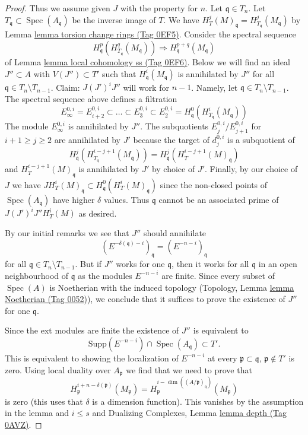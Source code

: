 \documentclass{amsart}
\theoremstyle{plain}
\theoremstyle{definition}
\theoremstyle{remark}
\numberwithin{equation}{subsection}
\def\Spec{\mathop{\mathrm{Spec}}}
\begin{document}
\begin{proof}
\medskip\noindent
Thus we assume given $J$ with the property for $n$.
Let $\mathfrak q \in T_n$. Let $T_\mathfrak q \subset \Spec(A_\mathfrak q)$
be the inverse image of $T$. We have
$H^j_T(M)_\mathfrak q = H^j_{T_\mathfrak q}(M_\mathfrak q)$
by Lemma \href{https://stacks.math.columbia.edu/tag/0EF5}{lemma torsion change rings (Tag 0EF5)}.
Consider the spectral sequence
$$
H_\mathfrak q^p(H^q_{T_\mathfrak q}(M_\mathfrak q))
\Rightarrow
H^{p + q}_\mathfrak q(M_\mathfrak q)
$$
of Lemma \href{https://stacks.math.columbia.edu/tag/0EF6}{lemma local cohomology ss (Tag 0EF6)}.
Below we will find an ideal $J'' \subset A$ with $V(J'') \subset T'$
such that $H^i_\mathfrak q(M_\mathfrak q)$ is annihilated by $J''$ for all
$\mathfrak q \in T_n \setminus T_{n - 1}$.
Claim: $J (J')^i J''$ will work for $n - 1$.
Namely, let $\mathfrak q \in T_n \setminus T_{n - 1}$.
The spectral sequence above defines a filtration
$$
E_\infty^{0, i} = E_{i + 2}^{0, i} \subset \ldots \subset E_3^{0, i} \subset
E_2^{0, i} = H^0_\mathfrak q(H^i_{T_\mathfrak q}(M_\mathfrak q))
$$
The module $E_\infty^{0, i}$ is annihilated by $J''$.
The subquotients $E_j^{0, i}/E_{j + 1}^{0, i}$ for $i + 1 \geq j \geq 2$
are annihilated by $J'$ because the target of $d_j^{0, i}$
is a subquotient of
$$
H^j_\mathfrak q(H^{i - j + 1}_{T_\mathfrak q}(M_\mathfrak q)) =
H^j_\mathfrak q(H^{i - j + 1}_T(M)_\mathfrak q)
$$
and $H^{i - j + 1}_T(M)_\mathfrak q$ is annihilated by $J'$ by choice of $J'$.
Finally, by our choice of $J$ we have
$J H^i_T(M)_\mathfrak q \subset H^0_\mathfrak q(H^i_T(M)_\mathfrak q)$
since the non-closed points of $\Spec(A_\mathfrak q)$ have higher
$\delta$ values. Thus $\mathfrak q$ cannot be an associated prime of
$J(J')^iJ'' H^i_T(M)$ as desired.

\medskip\noindent
By our initial remarks we see that $J''$ should annihilate
$$
(E^{-\delta(\mathfrak q) - i})_\mathfrak q =
(E^{-n - i})_\mathfrak q
$$
for all $\mathfrak q \in T_n \setminus T_{n - 1}$.
But if $J''$ works for one $\mathfrak q$, then it works for all
$\mathfrak q$ in an open neighbourhood of $\mathfrak q$
as the modules $E^{-n - i}$ are finite.
Since every subset of $\Spec(A)$ is Noetherian with the induced
topology (Topology, Lemma \href{https://stacks.math.columbia.edu/tag/0052}{lemma Noetherian (Tag 0052)}),
we conclude that it suffices
to prove the existence of $J''$ for one $\mathfrak q$.

\medskip\noindent
Since the ext modules are finite the existence of $J''$ is
equivalent to
$$
\text{Supp}(E^{-n - i}) \cap \Spec(A_\mathfrak q) \subset T'.
$$
This is equivalent to showing the localization of $E^{-n - i}$ at every
$\mathfrak p \subset \mathfrak q$, $\mathfrak p \not \in T'$
is zero. Using local duality over $A_\mathfrak p$ we find that we need
to prove that
$$
H^{i + n - \delta(\mathfrak p)}_\mathfrak p(M_\mathfrak p) =
H^{i - \dim((A/\mathfrak p)_\mathfrak q)}_\mathfrak p(M_\mathfrak p)
$$
is zero (this uses that $\delta$ is a dimension function).
This vanishes by the assumption in the lemma and $i \leq s$ and
Dualizing Complexes, Lemma \href{https://stacks.math.columbia.edu/tag/0AVZ}{lemma depth (Tag 0AVZ)}.


\end{proof}
\end{document}
